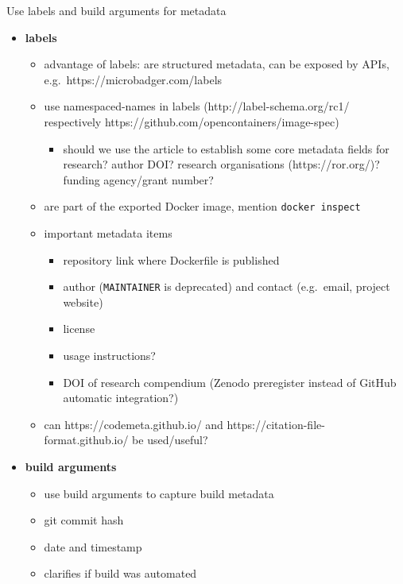 \documentclass[10pt,letterpaper]{article}
\providecommand{\tightlist}{%
  \setlength{\itemsep}{0pt}\setlength{\parskip}{0pt}}
\begin{document}
Use labels and build arguments for metadata

\begin{itemize}
\tightlist
\item
  \textbf{labels}

  \begin{itemize}
  \tightlist
  \item
    advantage of labels: are structured metadata, can be exposed by
    APIs, e.g.~https://microbadger.com/labels
  \item
    use namespaced-names in labels (http://label-schema.org/rc1/
    respectively https://github.com/opencontainers/image-spec)

    \begin{itemize}
    \tightlist
    \item
      should we use the article to establish some core metadata fields
      for research? author DOI? research organisations
      (https://ror.org/)? funding agency/grant number?
    \end{itemize}
  \item
    are part of the exported Docker image, mention
    \texttt{docker\ inspect}
  \item
    important metadata items

    \begin{itemize}
    \tightlist
    \item
      repository link where Dockerfile is published
    \item
      author (\texttt{MAINTAINER} is deprecated) and contact
      (e.g.~email, project website)
    \item
      license
    \item
      usage instructions?
    \item
      DOI of research compendium (Zenodo preregister instead of GitHub
      automatic integration?)
    \end{itemize}
  \item
    can https://codemeta.github.io/ and
    https://citation-file-format.github.io/ be used/useful?
  \end{itemize}
\item
  \textbf{build arguments}

  \begin{itemize}
  \tightlist
  \item
    use build arguments to capture build metadata
  \item
    git commit hash
  \item
    date and timestamp
  \item
    clarifies if build was automated
  \end{itemize}
\end{itemize}
\end{document}
